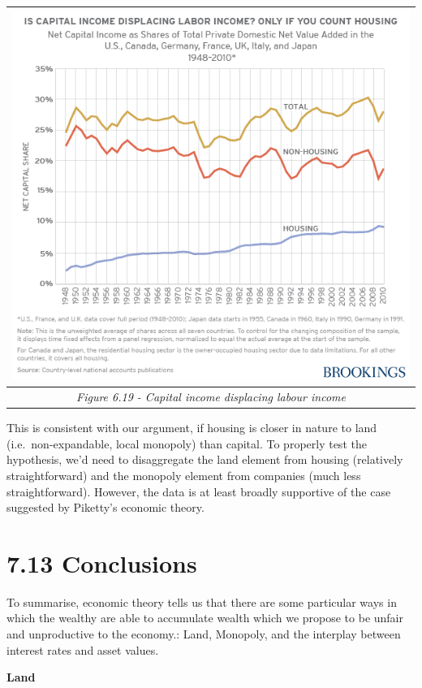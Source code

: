 \documentclass[]{tufte-handout}
\begin{document}
\begin{longtable}[]{@{}c@{}}
\toprule
\includegraphics{ChapterPictures/6-18-CapitalIncomeDisplacingLabourIncome.png}\tabularnewline
\midrule
\endhead
\emph{Figure 6.19 - Capital income displacing labour
income}\tabularnewline
\bottomrule
\end{longtable}

This is consistent with our argument, if housing is closer in nature to
land (i.e.~non-expandable, local monopoly) than capital. To properly
test the hypothesis, we'd need to disaggregate the land element from
housing (relatively straightforward) and the monopoly element from
companies (much less straightforward). However, the data is at least
broadly supportive of the case suggested by Piketty's economic theory.

\hypertarget{conclusions-2}{%
\section{7.13 Conclusions}\label{conclusions-2}}

To summarise, economic theory tells us that there are some particular
ways in which the wealthy are able to accumulate wealth which we propose
to be unfair and unproductive to the economy.: Land, Monopoly, and the
interplay between interest rates and asset values.

\textbf{Land}
\end{document}
